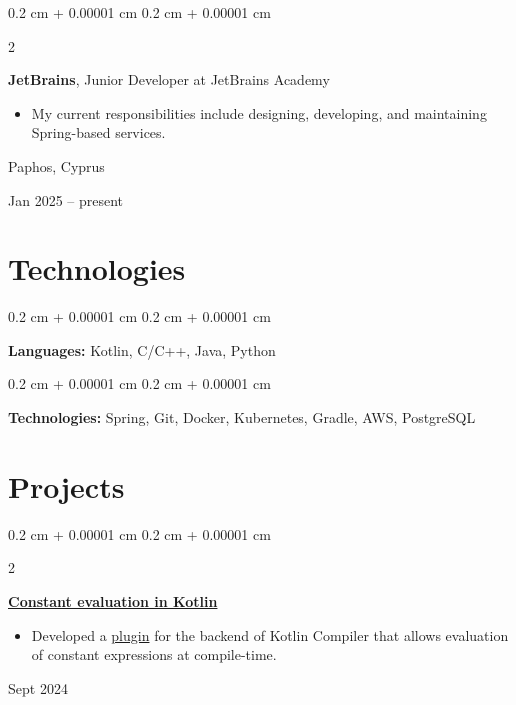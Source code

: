 \documentclass[10pt, letterpaper]{article}
\newenvironment{highlights}{
    \begin{itemize}[
        topsep=0.10 cm,
        parsep=0.10 cm,
        partopsep=0pt,
        itemsep=0pt,
        leftmargin=0.4 cm + 10pt
    ]
}{
    \end{itemize}
} %
\newenvironment{onecolentry}{
    \begin{adjustwidth}{
        0.2 cm + 0.00001 cm
    }{
        0.2 cm + 0.00001 cm
    }
}{
    \end{adjustwidth}
} %
\newenvironment{twocolentry}[2][]{
    \onecolentry
    \def\secondColumn{#2}
    \setcolumnwidth{\fill, 4.5 cm}
    \begin{paracol}{2}
}{
    \switchcolumn \raggedleft \secondColumn
    \end{paracol}
    \endonecolentry
} %
\begin{document}
        \vspace{0.2 cm}

        \begin{twocolentry}{
            Paphos, Cyprus

        Jan 2025 – present
        }
            \textbf{JetBrains}, Junior Developer at JetBrains Academy
            \begin{highlights}
                \item My current responsibilities include designing, developing, and maintaining Spring-based services.
            \end{highlights}
        \end{twocolentry}



    
    \section{Technologies}



        
        \begin{onecolentry}
            \textbf{Languages:} Kotlin, C/C++, Java, Python
        \end{onecolentry}

        \vspace{0.2 cm}

        \begin{onecolentry}
            \textbf{Technologies:} Spring, Git, Docker, Kubernetes, Gradle, AWS, PostgreSQL
        \end{onecolentry}


    
    \section{Projects}



        
        \begin{twocolentry}{
            Sept 2024
        }
            \textbf{\href{https://drive.google.com/file/d/1AD9tS-M0FZX2eGw5dcnHjX_YyEh3BLGl/view?usp=sharing}{Constant evaluation in Kotlin}}
            \begin{highlights}
                \item Developed a \href{https://github.com/SonyaBurg/kotlin-constexpr-support}{plugin} for the backend of Kotlin Compiler that allows evaluation of constant expressions at compile-time.
            \end{highlights}
        \end{twocolentry}
\end{document}
